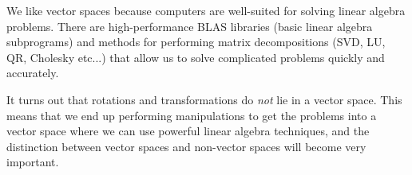%

We like vector spaces because computers are well-suited for solving
linear algebra problems. There are high-performance BLAS libraries
(basic linear algebra subprograms) and methods for performing matrix
decompositions (SVD, LU, QR, Cholesky etc...) that allow us to solve
complicated problems quickly and accurately. 

It turns out that rotations and transformations do \emph{not} lie
in a vector space. This means that we end up performing manipulations
to get the problems into a vector space where we can use powerful
linear algebra techniques, and the distinction between vector spaces
and non-vector spaces will become very important.

